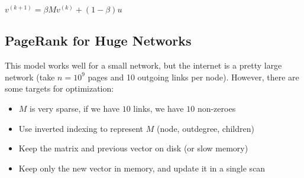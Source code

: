 $v^{(k+1)} = \beta M v^{(k)} + (1 - \beta)u$

\subsection{PageRank for Huge Networks}

This model works well for a small network, but the internet is a
pretty large network (take $n = 10^9$ pages and 10 outgoing links 
per node). However, there are some targets for optimization:

\begin{itemize}
  \item $M$ is very sparse, if we have $10$ links, we have $10$ non-zeroes
  \item Use inverted indexing to represent $M$ (node, outdegree, children)
  \item Keep the matrix and previous vector on disk (or slow memory)
  \item Keep only the new vector in memory, and update it in a single scan
\end{itemize}
